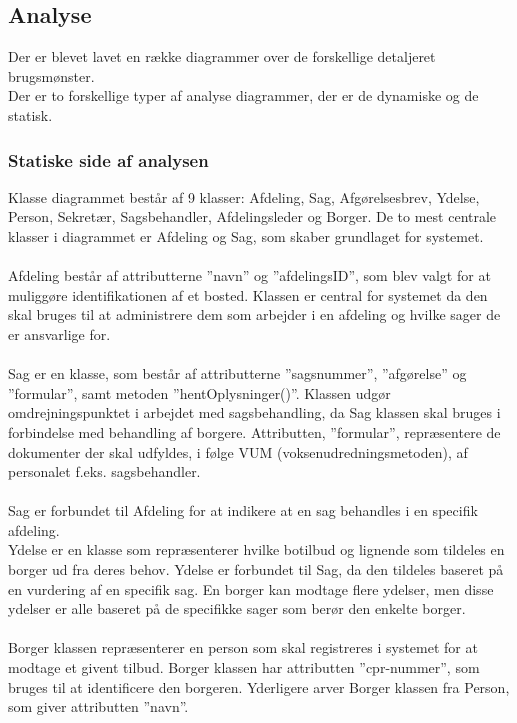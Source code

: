 \subsection{Analyse}
Der er blevet lavet en række diagrammer over de forskellige detaljeret brugsmønster.\\
Der er to forskellige typer af analyse diagrammer, der er de dynamiske og de statisk.

\subsubsection{Statiske side af analysen}
Klasse diagrammet består af 9 klasser: Afdeling, Sag, Afgørelsesbrev, Ydelse, Person, Sekretær, Sagsbehandler, Afdelingsleder og Borger. De to mest centrale klasser i diagrammet er Afdeling og Sag, som skaber grundlaget for systemet. \\ \\
Afdeling består af attributterne ”navn” og ”afdelingsID”, som blev valgt for at muliggøre identifikationen af et bosted. Klassen er central for systemet da den skal bruges til at administrere dem som arbejder i en afdeling og hvilke sager de er ansvarlige for. \\ \\
Sag er en klasse, som består af attributterne ”sagsnummer”, ”afgørelse” og ”formular”, samt metoden ”hentOplysninger()”. Klassen udgør omdrejningspunktet i arbejdet med sagsbehandling, da Sag klassen skal bruges i forbindelse med behandling af borgere. Attributten, ”formular”, repræsentere de dokumenter der skal udfyldes, i følge VUM (voksenudredningsmetoden), af personalet f.eks. sagsbehandler. \\ \\
Sag er forbundet til Afdeling for at indikere at en sag behandles i en specifik afdeling.\\
Ydelse er en klasse som repræsenterer hvilke botilbud og lignende som tildeles en borger ud fra deres behov. Ydelse er forbundet til Sag, da den tildeles baseret på en vurdering af en specifik sag. En borger kan modtage flere ydelser, men disse ydelser er alle baseret på de specifikke sager som berør den enkelte borger.\\ \\
Borger klassen repræsenterer en person som skal registreres i systemet for at modtage et givent tilbud. Borger klassen har attributten ”cpr-nummer”, som bruges til at identificere den borgeren. Yderligere arver Borger klassen fra Person, som giver attributten ”navn”.\\ \\
